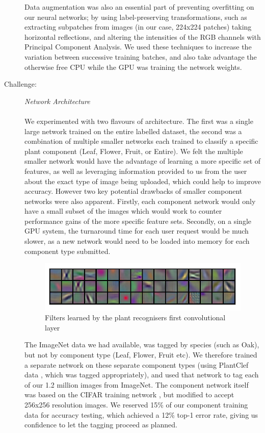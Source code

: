 \documentclass[a4paper,11pt]{article}
\begin{document}
\begin{description}
\hspace{5 mm} Data augmentation was also an essential part of preventing overfitting on our neural networks; by using label-preserving transformations, such as extracting subpatches from images (in our case, 224x224 patches) taking horizontal reflections, and altering the intensities of the RGB channels with Principal Component Analysis. We used these techniques to increase the variation between successive training batches, and also take advantage the otherwise free CPU while the GPU was training the network weights.\\


\item [Challenge:] \textit{Network Architecture}\\\\
We experimented with two flavours of architecture.  The first was a single large network trained on the entire labelled dataset, the second was a combination of multiple smaller networks each trained to classify a specific plant component (Leaf, Flower, Fruit, or Entire).  We felt the multiple smaller network would have the advantage of learning a more specific set of features, as well as leveraging information provided to us from the user about the exact type of image being uploaded, which could help to improve accuracy. However two key potential drawbacks of smaller component networks were also apparent. Firstly, each component network would only have a small subset of the images which would work to counter performance gains of the more specific feature sets.  Secondly, on a single GPU system, the turnaround time for each user request would be much slower, as a new network would need to be loaded into memory for each component type submitted.


\begin{figure}[h!]
	\centering
	\includegraphics[width=0.80\linewidth]{filters.png}
	\caption{Filters learned by the plant recognisers first convolutional layer}
        \label{fig:ml_filters}
\end{figure}


\hspace{5 mm} The ImageNet data we had available, was tagged by species (such as Oak), but not by component type (Leaf, Flower, Fruit etc). We therefore trained a separate network on these separate component types (using PlantClef data \cite{plantclef}, which was tagged appropriately), and used that network to tag each of our 1.2 million images from ImageNet. The component network itself was based on the CIFAR training network \cite{cudaconv}, but modified to accept 256x256 resolution images.  We reserved 15\% of our component training data for accuracy testing, which achieved a 12\% top-1 error rate, giving us confidence to let the tagging proceed as planned.


\end{description}
\end{document}

